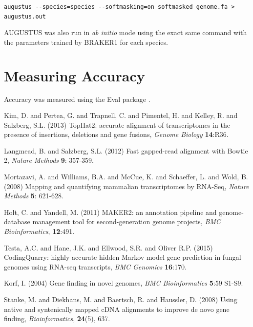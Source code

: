 \documentclass[a4paper,10pt]{report}
\begin{document}
\begin{verbatim}
augustus --species=species --softmasking=on softmasked_genome.fa > augustus.out 
\end{verbatim}

\noindent AUGUSTUS was also run in \textit{ab initio} mode using the exact same command with the parameters trained by BRAKER1 for each species.


\section{Measuring Accuracy}

Accuracy was measured using the Eval package \cite{Eval}.



\begin{thebibliography}{}
 Kim, D. and Pertea, G. and Trapnell, C. and Pimentel, H. and Kelley, R. and Salzberg, S.L. (2013) TopHat2: accurate alignment of transcriptomes in the presence of insertions, deletions and gene fusions, {\it Genome Biology} \textbf{14}:R36.

 Langmead, B. and Salzberg, S.L. (2012) Fast gapped-read alignment with Bowtie 2, \textit{Nature Methods} \textbf{9}: 357-359.

 Mortazavi, A. and Williams, B.A. and McCue, K. and Schaeffer, L. and Wold, B. (2008) Mapping and quantifying mammalian transcriptomes by RNA-Seq, \textit{Nature Methods} \textbf{5}: 621-628.

 Holt, C. and Yandell, M. (2011) MAKER2: an annotation pipeline and genome-database management tool for second-generation genome projects, \textit{BMC Bioinformatics}, \textbf{12}:491.

 Testa, A.C. and Hane, J.K. and Ellwood, S.R. and Oliver R.P. (2015) CodingQuarry: highly accurate hidden Markov model gene prediction in fungal genomes using RNA-seq transcripts, \textit{BMC Genomics} \textbf{16}:170.

 Korf, I. (2004) Gene finding in novel genomes, \textit{BMC Bioinformatics} \textbf{5}:59 S1-S9.

Stanke, M. and Diekhans, M. and Baertsch, R. and Haussler, D. (2008) Using native and syntenically mapped cDNA alignments to improve de novo gene finding, \textit{Bioinformatics}, \textbf{24}(5), 637.


\end{thebibliography}
\end{document}
